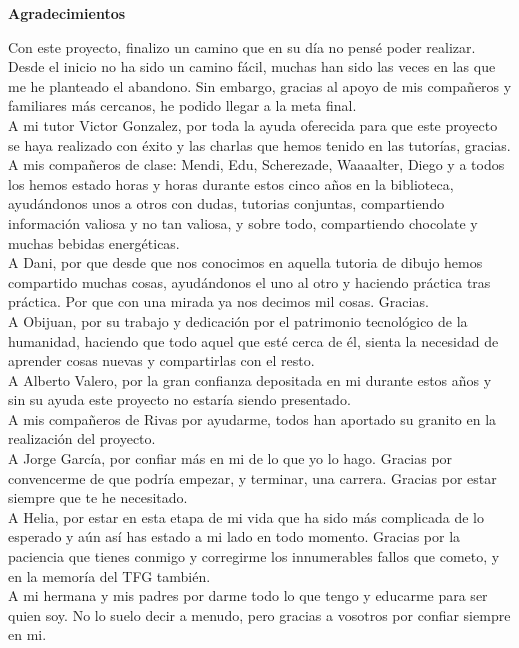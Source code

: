 \newpage{}
\thispagestyle{plain}
\begin{center}
    \Large
    \vspace{0.9cm}
    \textbf{Agradecimientos}
\end{center}

Con este proyecto, finalizo un camino que en su día no pensé poder realizar. Desde el inicio no ha sido un camino fácil, muchas han sido las veces en las que me he planteado el abandono. Sin embargo, gracias al apoyo de mis compañeros y familiares más cercanos, he podido llegar a la meta final.\\

A mi tutor Victor Gonzalez, por toda la ayuda oferecida para que este proyecto se haya realizado con éxito y las charlas que hemos tenido en las tutorías, gracias.\\

A mis compañeros de clase: Mendi, Edu, Scherezade, Waaaalter, Diego y a todos los hemos estado horas y horas durante estos cinco años en la biblioteca, ayudándonos unos a otros con dudas, tutorias conjuntas, compartiendo información valiosa y no tan valiosa, y sobre todo, compartiendo chocolate y muchas bebidas energéticas. \\

A Dani, por que desde que nos conocimos en aquella tutoria de dibujo hemos compartido muchas cosas, ayudándonos el uno al otro y haciendo práctica tras práctica. Por que con una mirada ya nos decimos mil cosas. Gracias.\\

A Obijuan, por su trabajo y dedicación por el patrimonio tecnológico de la humanidad, haciendo que todo aquel que esté cerca de él, sienta la necesidad de aprender cosas nuevas y compartirlas con el resto.\\

A Alberto Valero, por la gran confianza depositada en mi durante estos años y sin su ayuda este proyecto no estaría siendo presentado.\\

A mis compañeros de Rivas por ayudarme, todos han aportado su granito en la realización del proyecto.\\

A Jorge García, por confiar más en mi de lo que yo lo hago. Gracias por convencerme de que podría empezar, y terminar, una carrera. Gracias por estar siempre que te he necesitado.\\

A Helia, por estar en esta etapa de mi vida que ha sido más complicada de lo esperado y aún así has estado a mi lado en todo momento. Gracias por la paciencia que tienes conmigo y corregirme los innumerables fallos que cometo, y en la memoría del TFG también.\\

A mi hermana y mis padres por darme todo lo que tengo y educarme para ser quien soy. No lo suelo decir a menudo, pero gracias a vosotros por confiar siempre en mi.\\